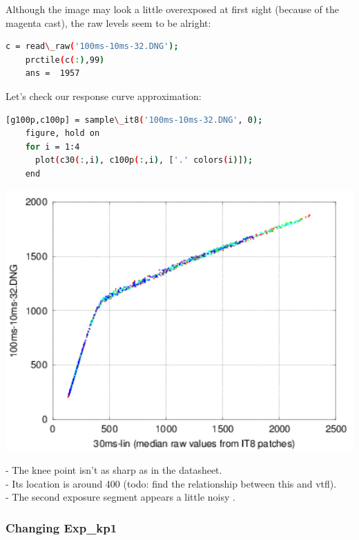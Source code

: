 Although the image may look a little overexposed at first sight (because of the magenta cast), the raw levels seem to be alright: 

\begin{lstlisting}[language=bash,morekeywords=$,keywordstyle=\bfseries,frame=none,xleftmargin=.25in,belowskip=2em, aboveskip=2em]
    c = read\_raw('100ms-10ms-32.DNG');
    prctile(c(:),99)
    ans =  1957
\end{lstlisting}


Let's check our response curve approximation:

 \begin{lstlisting}[language=bash,morekeywords=$,keywordstyle=\bfseries,frame=none,xleftmargin=.25in,belowskip=2em, aboveskip=2em]
    [g100p,c100p] = sample\_it8('100ms-10ms-32.DNG', 0);
    figure, hold on
    for i = 1:4
      plot(c30(:,i), c100p(:,i), ['.' colors(i)]);
    end
\end{lstlisting}

\begin{center}
\includegraphics[height=10cm]{images/100-10-32-plr-vs-30ms-lin}
\end{center}

- The knee point isn't as sharp as in the datasheet.\\
- Its location is around 400 (todo: find the relationship between this and vtfl).\\
- The second exposure segment appears a little noisy .\\

\subsubsection{Changing Exp\_kp1}

